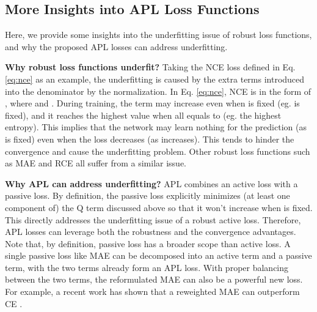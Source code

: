 \documentclass{article}
\begin{document}
\subsection{More Insights into APL Loss Functions}
Here, we provide some insights into the underfitting issue of robust loss functions, and why the proposed APL losses can address underfitting.

\noindent\textbf{Why robust loss functions underfit?}
Taking the NCE loss defined in Eq. \eqref{eq:nce} as an example, the underfitting is caused by the extra terms introduced into the denominator by the normalization. In Eq. \eqref{eq:nce}, NCE is in the form of , where  and . During training, the  term may increase even when  is fixed (eg.  is fixed), and it reaches the highest value when all  equals to  (eg. the highest entropy). This implies that the network may learn nothing for the prediction (as  is fixed) even when the loss decreases (as  increases). This tends to hinder the convergence and cause the underfitting problem. Other robust loss functions such as MAE and RCE all suffer from a similar issue.

\noindent\textbf{Why APL can address underfitting?}
APL combines an active loss with a passive loss. By definition, the passive loss explicitly minimizes (at least one component of) the Q term discussed above so that it won’t increase when  is fixed. This directly addresses the underfitting issue of a robust active loss. Therefore, APL losses can leverage both the robustness and the convergence advantages.
Note that, by definition, passive loss has a broader scope than active loss. A single passive loss like MAE can be decomposed into an active term and a passive term, with the two terms already form an APL loss. With proper balancing between the two terms, the reformulated MAE can also be a powerful new loss. For example, a recent work has shown that a reweighted MAE can outperform CE \cite{wang2019imae}.
\end{document}
